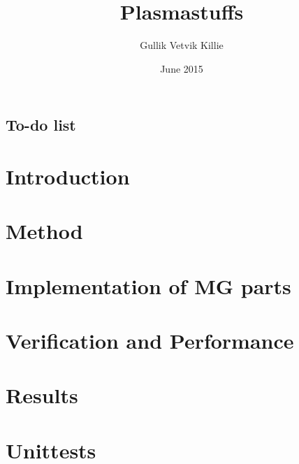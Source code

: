 \documentclass[x11names,twoside,english]{uiofysmaster}
\author{Gullik Vetvik Killie}
\title{Plasmastuffs}
\date{June 2015}
\begin{document}
% 
\tableofcontents
\section{To-do list}


\chapter{Introduction}
    

\chapter{Method}
  
  
%
\chapter{Implementation of MG parts}
  
  
  
  
%
\chapter{Verification and Performance}
  
  
  

\chapter{Results}
  
%
%   
%
%   
%
\appendix
    
  \chapter{Unittests}
  
%
%
%   
%
%   
\end{document}
